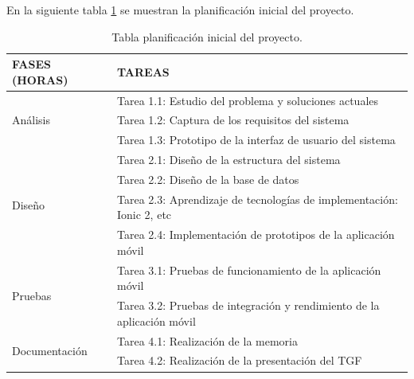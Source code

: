 \medskip
En la siguiente tabla \ref{planificacion-inicial} se muestran la planificación inicial del proyecto.
\begin{table}
    \begin{tabular}{|lp{12cm}|}
        \hline
        FASES (HORAS) & TAREAS \\ \hline

        \multirow{3}{*}{Análisis}
        \multirow{3}{*}{(70)}
        & Tarea 1.1: Estudio del problema y soluciones actuales \\
        & Tarea 1.2: Captura de los requisitos del sistema \\
        & Tarea 1.3: Prototipo de la interfaz de usuario del sistema \\ \hline

        \multirow{4}{*}{Diseño}
        \multirow{4}{*}{(160)}
        & Tarea 2.1: Diseño de la estructura del sistema \\
        & Tarea 2.2: Diseño de la base de datos \\
        & Tarea 2.3: Aprendizaje de tecnologías de implementación: Ionic 2, etc \\
        & Tarea 2.4: Implementación de prototipos de la aplicación móvil \\ \hline

        \multirow{2}{*}{Pruebas}
        \multirow{2}{*}{(30)}
        & Tarea 3.1: Pruebas de funcionamiento de la aplicación móvil \\
        & Tarea 3.2: Pruebas de integración y rendimiento de la aplicación móvil \\ \hline

        \multirow{2}{*}{Documentación}
        \multirow{2}{*}{(40)}
        & Tarea 4.1: Realización de la memoria \\
        & Tarea 4.2: Realización de la presentación del TGF \\ \hline
    \end{tabular}

    \caption{Tabla planificación inicial del proyecto.}\label{planificacion-inicial}
\end{table}